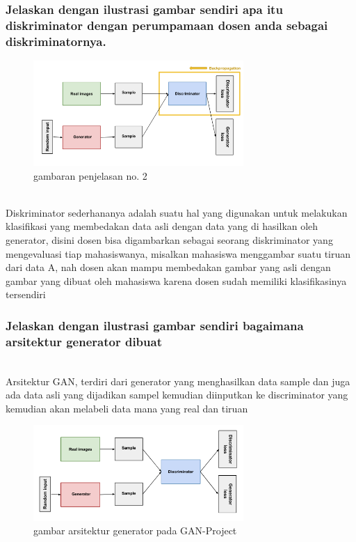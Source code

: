 \subsubsection{Jelaskan dengan ilustrasi gambar sendiri apa itu diskriminator dengan perumpamaan dosen anda sebagai diskriminatornya.}
\begin{figure}[H]
	\centering
	\includegraphics[width=8cm]{figures/1174070/8/discriminator.png}
	\caption{gambaran penjelasan no. 2}
\end{figure}
\hfill\\
Diskriminator sederhananya adalah suatu hal yang digunakan untuk melakukan klasifikasi yang membedakan data asli dengan data yang di hasilkan oleh generator, disini dosen bisa digambarkan sebagai seorang diskriminator yang mengevaluasi tiap mahasiswanya, misalkan mahasiswa menggambar suatu tiruan dari data A, nah dosen akan mampu membedakan gambar yang asli dengan gambar yang dibuat oleh mahasiswa karena dosen sudah memiliki klasifikasinya tersendiri


\subsubsection{Jelaskan dengan ilustrasi gambar sendiri bagaimana arsitektur generator dibuat}
\hfill\\
Arsitektur GAN, terdiri dari generator yang menghasilkan data sample dan juga ada data asli yang dijadikan sampel kemudian diinputkan ke discriminator yang kemudian akan melabeli data mana yang real dan tiruan
\begin{figure}[H]
	\centering
	\includegraphics[width=8cm]{figures/1174070/8/arsitektur_GAN.png}
	\caption{gambar arsitektur generator pada GAN-Project}
\end{figure}


